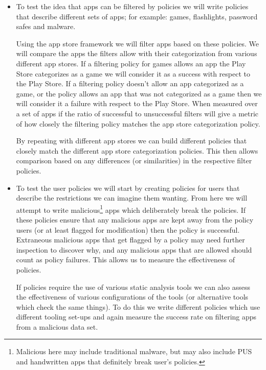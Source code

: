 \documentclass[a4paper,sfsidenotes]{%
  scrartcl%
}
\begin{document}
\begin{itemize}
\begin{description}
  \end{description}

  \item To test the idea that apps can be filtered by policies we will write
    policies that describe different sets of apps; for example: games,
    flashlights, password safes and malware.  

    Using the app store framework we will filter apps based on these policies.
    We will compare the apps the filters allow with their categorization from
    various different app stores.  If a filtering policy for games allows an app
    the Play Store categorizes as a game we will consider it as a success with
    respect to the Play Store.  If a filtering policy doesn't allow an app
    categorized as a game, or the policy allows an app that was not categorized
    as a game then we will consider it a failure with respect to the Play Store.
    When measured over a set of apps if the ratio of successful to unsuccessful
    filters will give a metric of how closely the filtering policy matches the
    app store categorization policy.

    By repeating with different app stores we can build different policies that
    closely match the different app store categorization policies.  This then
    allows comparison based on any differences (or similarities) in the
    respective filter policies. 

  \item To test the user policies we will start by creating policies for users
    that describe the restrictions we can imagine them wanting.  From here we
    will attempt to write malicious\footnote{Malicious here may include
      traditional malware, but may also include \ac{PUS} and handwritten apps
    that definitely break user's policies.} apps which deliberately break the
    policies.   If these policies ensure that any malicious apps are kept away
    from the policy users (or at least flagged for modification) then the policy
    is successful.  Extraneous malicious apps that get flagged by a policy may
    need further inspection to discover why, and any malicious apps that are
    allowed should count as policy failures.  This allows us to measure the
    effectiveness of policies.

    If policies require the use of various static analysis tools we can also
    assess the effectiveness of various configurations of the tools (or
    alternative tools which check the same things).  To do this we write
    different policies which use different tooling set-ups and again measure the
    success rate on filtering apps from a malicious data set.


\end{itemize}
\end{document}
